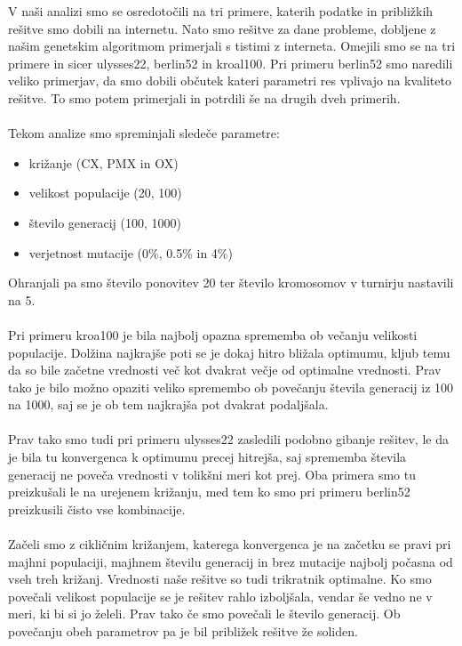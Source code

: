 \documentclass[12pt,a4paper]{amsart}
\theoremstyle{definition} %
\theoremstyle{plain} %
\begin{document}
V naši analizi smo se osredotočili na tri primere, katerih podatke in približkih rešitve smo dobili na internetu. Nato smo rešitve za dane probleme, dobljene z našim genetskim algoritmom primerjali s tistimi z interneta. Omejili smo se na tri primere in sicer ulysses22, berlin52 in kroal100. Pri primeru berlin52 smo naredili veliko primerjav, da smo dobili občutek kateri parametri res vplivajo na kvaliteto rešitve. To smo potem primerjali in potrdili še na drugih dveh primerih. 
\\
\\
Tekom analize smo spreminjali sledeče parametre:
\begin{itemize}
\item križanje (CX, PMX in OX)
\item velikost populacije (20, 100)
\item število generacij (100, 1000)
\item verjetnost mutacije (0\%, 0.5\% in 4\%)

 \end{itemize}
Ohranjali pa smo število ponovitev 20 ter število kromosomov v turnirju nastavili na 5.
\\
\\
Pri primeru kroa100 je bila najbolj opazna sprememba ob večanju velikosti populacije. Dolžina najkrajše poti se je dokaj hitro bližala optimumu, kljub temu da so bile začetne vrednosti več kot dvakrat večje od optimalne vrednosti. 
Prav tako je bilo možno opaziti veliko spremembo ob povečanju števila generacij iz 100 na 1000, saj se je ob tem najkrajša pot dvakrat podaljšala.
\\
\\
Prav tako smo tudi pri primeru ulysses22 zasledili podobno gibanje rešitev, le da je bila tu konvergenca k optimumu precej hitrejša, saj sprememba števila generacij ne poveča vrednosti v tolikšni meri kot prej. Oba primera smo tu preizkušali le na urejenem križanju, med tem ko smo pri primeru berlin52 preizkusili čisto vse kombinacije. 
\\
\\
Začeli smo z cikličnim križanjem, katerega konvergenca je na začetku se pravi pri majhni populaciji, majhnem številu generacij in brez mutacije najbolj počasna od vseh treh križanj. Vrednosti naše rešitve so tudi trikratnik optimalne. Ko smo povečali velikost populacije se je rešitev rahlo izboljšala, vendar še vedno ne v meri, ki bi si jo želeli. Prav tako če smo povečali le število generacij. Ob povečanju obeh parametrov pa je bil približek rešitve že soliden. 
\end{document}
